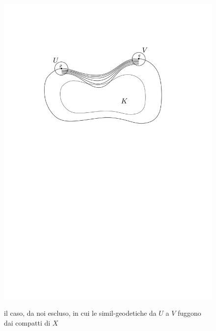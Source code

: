 \begin{figure}[h!]
    \begin{center}
        \includegraphics[width=1.10\textwidth, trim=0 18cm 0 5cm]{Immagini/nonvis.png} \\
        \caption{il caso, da noi escluso, in cui le simil-geodetiche da $U$ a $V$ fuggono dai compatti di $X$}
    \end{center}
\end{figure}
\newpage
